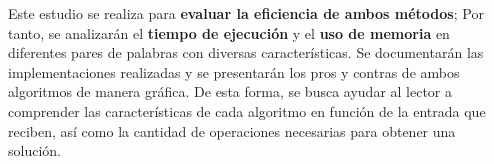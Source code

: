 Este estudio se realiza para \textbf{evaluar la eficiencia de ambos métodos}; Por tanto, se analizarán el \textbf{tiempo de ejecución} y el \textbf{uso de memoria} en diferentes pares de palabras con diversas características. Se documentarán las implementaciones realizadas y se presentarán los pros y contras de ambos algoritmos de manera gráfica. De esta forma, se busca ayudar al lector a comprender las características de cada algoritmo en función de la entrada que reciben, así como la cantidad de operaciones necesarias para obtener una solución.


